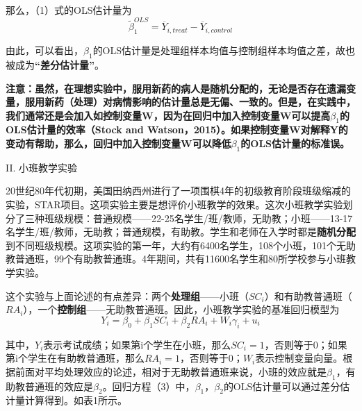 \documentclass[cn,12pt,math=newtx,citestyle=gb7714-2015,bibstyle=gb7714-2015]{elegantbook}
\begin{document}
	那么，（1）式的OLS估计量为
	\begin{equation}
		\tilde{\beta}_1^{OLS}=\overline{Y}_{i,treat}-\overline{Y}_{i,control}
	\end{equation}
	
	由此，可以看出，$\beta_1$的OLS估计量是处理组样本均值与控制组样本均值之差，故也被成为\textbf{“差分估计量”}。
	
	\textbf{注意：虽然，在理想实验中，服用新药的病人是随机分配的，无论是否存在遗漏变量，服用新药（处理）对病情影响的估计量总是无偏、一致的。但是，在实践中，我们通常还是会加入如控制变量W，因为在回归中加入控制变量W可以提高$\beta_1$的OLS估计量的效率（Stock and Watson，2015）。如果控制变量W对解释Y的变动有帮助，那么，回归中加入控制变量W可以降低$\beta_1$的OLS估计量的标准误。}
	
	II. 小班教学实验
	
	20世纪80年代初期，美国田纳西州进行了一项围棋4年的初级教育阶段班级缩减的实验，STAR项目。这项实验主要是想评价小班教学的效果。这次小班教学实验划分了三种班级规模：普通规模——22-25名学生/班/教师，无助教；小班——13-17名学生/班/教师，无助教；普通规模，有助教。学生和老师在入学时都是\textbf{随机分配}到不同班级规模。这项实验的第一年，大约有6400名学生，108个小班，101个无助教普通班，99个有助教普通班。4年期间，共有11600名学生和80所学校参与小班教学实验。
	
	这个实验与上面论述的有点差异：两个\textbf{处理组}——小班（$SC_i$）和有助教普通班（$RA_i$），一个\textbf{控制组}——无助教普通班。因此，小班教学实验的基准回归模型为
	\begin{equation}
		Y_i=\beta_0+\beta_1SC_i+\beta_2RA_i+W_i\gamma_i+u_i
	\end{equation}
	
	其中，$Y_i$表示考试成绩；如果第i个学生在小班，那么$SC_i=1$，否则等于0；如果第i个学生在有助教普通班，那么$RA_i=1$，否则等于0；$W_i$表示控制变量向量。根据前面对平均处理效应的论述，相对于无助教普通班来说，小班的效应就是$\beta_1$，有助教普通班的效应是$\beta_2$。回归方程（3）中，$\beta_1$，$\beta_2$的OLS估计量可以通过差分估计量计算得到。如表1所示。
	
\end{document}
